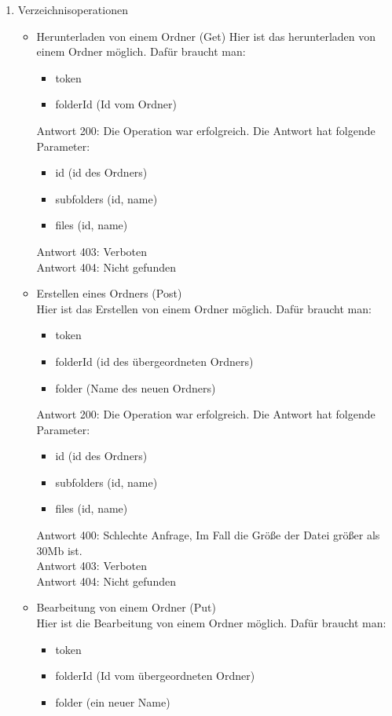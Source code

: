 \begin{enumerate}
\item Verzeichnisoperationen
\begin{itemize}
\item Herunterladen von einem Ordner (Get)
Hier ist das herunterladen von einem Ordner m\"oglich. Daf\"ur braucht man: 
\begin{itemize}
\item token
\item folderId (Id vom Ordner) 
\end{itemize}
Antwort 200: Die Operation war erfolgreich. Die Antwort hat folgende Parameter:
\begin{itemize}
	\item id (id des Ordners)
	\item subfolders (id, name)
	\item files (id, name)
\end{itemize}
Antwort 403: Verboten \\
Antwort 404: Nicht gefunden
\item Erstellen eines Ordners (Post) \\
Hier ist das Erstellen von einem Ordner m\"oglich. Daf\"ur braucht man:
\begin{itemize}
\item token
\item folderId (id des \"ubergeordneten Ordners)
\item folder (Name des neuen Ordners)
\end{itemize}
Antwort 200: Die Operation war erfolgreich. Die Antwort hat folgende Parameter:
\begin{itemize}
	\item id (id des Ordners)
	\item subfolders (id, name)
	\item files (id, name)
\end{itemize}
Antwort 400: Schlechte Anfrage, Im Fall die Gr\"o{\ss}e der Datei gr\"o{\ss}er als 30Mb ist. \\
Antwort 403: Verboten \\
Antwort 404: Nicht gefunden
\item Bearbeitung von einem Ordner (Put) \\
Hier ist die Bearbeitung von einem Ordner m\"oglich. Daf\"ur braucht man: 
\begin{itemize}
\item token
\item folderId (Id vom \"ubergeordneten Ordner) 
\item folder (ein neuer Name) 

\end{itemize}
\end{itemize}
\end{enumerate}
